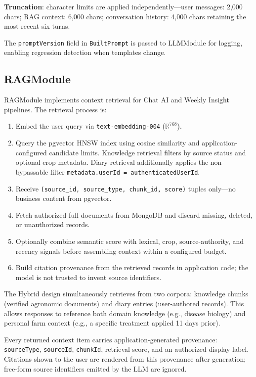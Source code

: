 \documentclass[conference]{IEEEtran}
\begin{document}
\textbf{Truncation}: character limits are applied independently---user messages: 2,000 chars; RAG context: 6,000 chars; conversation history: 4,000 chars retaining the most recent six turns.

The \texttt{promptVersion} field in \texttt{BuiltPrompt} is passed to LLMModule for logging, enabling regression detection when templates change.

\subsection{RAGModule}

RAGModule implements context retrieval for Chat AI and Weekly Insight pipelines. The retrieval process is:

\begin{enumerate}
    \item Embed the user query via \texttt{text-embedding-004} ($\mathbb{R}^{768}$).
    \item Query the pgvector HNSW index using cosine similarity and application-configured candidate limits. Knowledge retrieval filters by source status and optional crop metadata. Diary retrieval additionally applies the non-bypassable filter \texttt{metadata.userId = authenticatedUserId}.
    \item Receive \texttt{(source\_id, source\_type, chunk\_id, score)} tuples only---no business content from pgvector.
    \item Fetch authorized full documents from MongoDB and discard missing, deleted, or unauthorized records.
    \item Optionally combine semantic score with lexical, crop, source-authority, and recency signals before assembling context within a configured budget.
    \item Build citation provenance from the retrieved records in application code; the model is not trusted to invent source identifiers.
\end{enumerate}

The Hybrid design simultaneously retrieves from two corpora: knowledge chunks (verified agronomic documents) and diary entries (user-authored records). This allows responses to reference both domain knowledge (e.g., disease biology) and personal farm context (e.g., a specific treatment applied 11 days prior).

Every returned context item carries application-generated provenance: \texttt{sourceType}, \texttt{sourceId}, \texttt{chunkId}, retrieval score, and an authorized display label. Citations shown to the user are rendered from this provenance after generation; free-form source identifiers emitted by the LLM are ignored.
\end{document}
